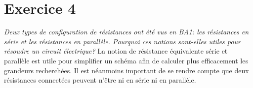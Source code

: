 \section{Exercice 4}
{%
\textit{Deux types de configuration de résistances ont été vus en BA1: les résistances en série et les résistances en parallèle. Pourquoi ces notions sont-elles utiles pour résoudre un circuit électrique?}
}
{%
La notion de résistance équivalente série et parallèle est utile pour simplifier un schéma afin de calculer plus efficacement les grandeurs recherchées. Il est néanmoins important de se rendre compte que deux résistances connectées peuvent n'être ni en série ni en parallèle.
}

